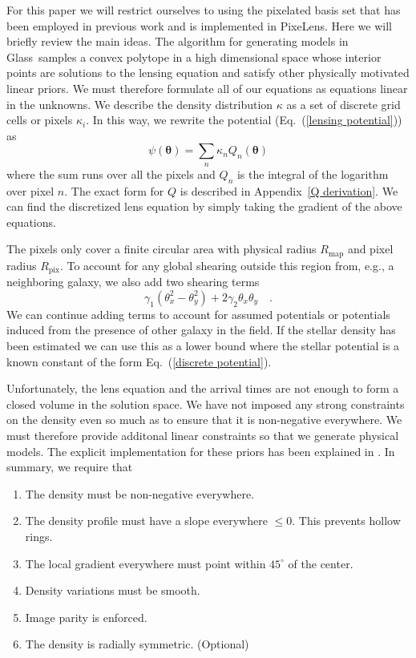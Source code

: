 \documentclass[onecolumn,galley]{mn2e}
\newcommand{\Glass}{{\sc Glass}}
\newcommand{\PixeLens}{{\sc PixeLens}}
\newcommand{\Rmap}{\ensuremath{R_\mathrm{map}}}
\newcommand{\Rpix}{\ensuremath{R_\mathrm{pix}}}
\newcommand{\eqnref}[1] {Eq.~(\ref{#1})}
\newcommand{\appref}[1] {Appendix~\ref{#1}}
\renewcommand{\vec}[1]{\ensuremath{\boldsymbol{#1}}}
\begin{document}
For this paper we will restrict ourselves to using the pixelated basis set that
has been employed in previous work and is implemented in \PixeLens. Here we will
briefly review the main ideas. The algorithm for generating models in \Glass\
samples a convex polytope in a high dimensional space whose interior points are
solutions to the lensing equation and satisfy other physically motivated linear
priors. We must therefore formulate all of our equations as equations linear in the
unknowns. We describe the density distribution
$\kappa$ as a set of discrete grid cells or pixels $\kappa_i$.
In this way, we rewrite the potential (\eqnref{lensing potential}) as
%
\begin{equation}
  \psi(\vec\theta) = \sum_n \kappa_n Q_n(\vec\theta)
  \label{discrete potential}
\end{equation}
%
where the sum runs over all the pixels and $Q_n$ is the integral of the logarithm
over pixel $n$. The exact form for $Q$ is described in \appref{Q derivation}.
We can find the discretized lens equation by simply taking the gradient of the
above equations. 

The pixels only cover a finite circular area with physical radius $\Rmap$ and 
pixel radius $\Rpix$. To account for any global shearing outside this region
from, e.g., a neighboring galaxy, we also add two shearing terms
%
\begin{equation}
\gamma_1(\theta_x^2 - \theta_y^2) + 2\gamma_2\theta_x\theta_y\quad.
\end{equation}
%
We can continue adding terms to account for assumed potentials or potentials
induced from the presence of other galaxy in the field. If the stellar density
has been estimated we can use this as a lower bound where the stellar potential
is a known constant of the form \eqnref{discrete potential}.
%
%


Unfortunately, the lens equation and the arrival times are not enough to form a
closed volume in the solution space. We have not imposed any strong constraints
on the density even so much as to ensure that it is non-negative everywhere. We
must therefore provide additonal linear constraints so that we generate
physical models. The explicit implementation for these priors has been
explained in \cite{}. In summary, we require that
\begin{enumerate}
\item The density must be non-negative everywhere.
\item The density profile must have a slope everywhere $\le 0$. This prevents hollow rings.
\item The local gradient everywhere must point within $45^{\circ}$ of the center.
\item Density variations must be smooth.
\item Image parity is enforced.
\item The density is radially symmetric. (Optional)
\end{enumerate}
\end{document}
